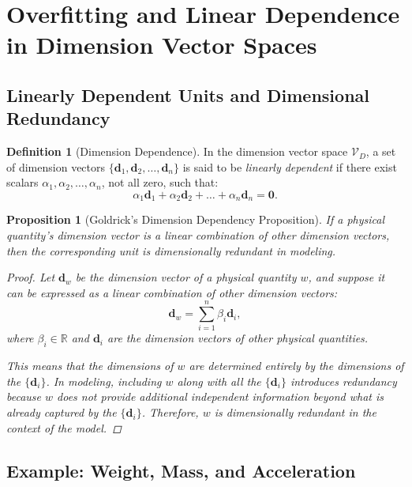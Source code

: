 \documentclass{article}
\newtheorem{proposition}{Proposition}[section]
\theoremstyle{definition}
\newtheorem{definition}{Definition}[section]
\theoremstyle{remark}
\begin{document}
	\section{Overfitting and Linear Dependence in Dimension Vector Spaces}
	
	\subsection{Linearly Dependent Units and Dimensional Redundancy}
	
	\begin{definition}[Dimension Dependence]
		In the dimension vector space $\mathcal{V}_D$, a set of dimension vectors $\{ \mathbf{d}_1, \mathbf{d}_2, \dots, \mathbf{d}_n \}$ is said to be \emph{linearly dependent} if there exist scalars $\alpha_1, \alpha_2, \dots, \alpha_n$, not all zero, such that:
		\[
		\alpha_1 \mathbf{d}_1 + \alpha_2 \mathbf{d}_2 + \dots + \alpha_n \mathbf{d}_n = \mathbf{0}.
		\]
	\end{definition}
	
	\begin{proposition}[Goldrick's Dimension Dependency Proposition]
		If a physical quantity's dimension vector is a linear combination of other dimension vectors, then the corresponding unit is \emph{dimensionally redundant} in modeling.
		
		\begin{proof}
			Let $\mathbf{d}_w$ be the dimension vector of a physical quantity $w$, and suppose it can be expressed as a linear combination of other dimension vectors:
			\[
			\mathbf{d}_w = \sum_{i=1}^{n} \beta_i \mathbf{d}_i,
			\]
			where $\beta_i \in \mathbb{R}$ and $\mathbf{d}_i$ are the dimension vectors of other physical quantities.
			
			This means that the dimensions of $w$ are determined entirely by the dimensions of the $\{ \mathbf{d}_i \}$. In modeling, including $w$ along with all the $\{ \mathbf{d}_i \}$ introduces redundancy because $w$ does not provide additional independent information beyond what is already captured by the $\{ \mathbf{d}_i \}$. Therefore, $w$ is dimensionally redundant in the context of the model.
		\end{proof}
	\end{proposition}
	
	\subsection{Example: Weight, Mass, and Acceleration}
	
\end{document}
